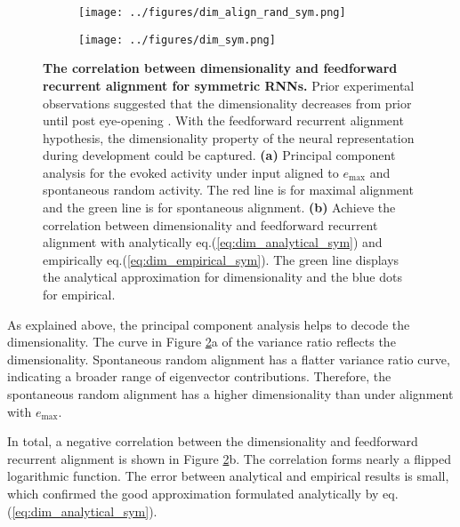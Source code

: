 \documentclass[11pt]{article}
\begin{document}
		\begin{figure}[H] 
			\centering
			\begin{subfigure}[b]{0.45\textwidth} 
				\texttt{[image: ../figures/dim\_align\_rand\_sym.png]}
				\caption{}
			\end{subfigure}
			\begin{subfigure}[b]{0.45\textwidth}
				\texttt{[image: ../figures/dim\_sym.png]}
				\caption{}
				\label{fig:dim_sym}
			\end{subfigure}
			\vspace{-0.2cm}
			\caption[The correlation between dimensionality and feedforward recurrent alignment for symmetric RNNs]{\textbf{The correlation between dimensionality and feedforward recurrent alignment for symmetric RNNs.} Prior experimental observations suggested that the dimensionality decreases from prior until post eye-opening \cite{tragenap2023nature}. With the feedforward recurrent alignment hypothesis, the dimensionality property of the neural representation during development could be captured. \textbf{(a)} Principal component analysis for the evoked activity under input aligned to $e_{\text{max}}$ and spontaneous random activity. The red line is for maximal alignment and the green line is for spontaneous alignment. \textbf{(b)} Achieve the correlation between dimensionality and feedforward recurrent alignment with analytically eq.(\ref{eq:dim_analytical_sym}) and empirically eq.(\ref{eq:dim_empirical_sym}). The green line displays the analytical approximation for dimensionality and the blue dots for empirical.} 
			\label{fig:correlation_dim_ffrec_sym}
		\end{figure}
	\vspace{-0.2cm}
	As explained above, the principal component analysis helps to decode the dimensionality. The curve in Figure \ref{fig:correlation_dim_ffrec_sym}a of the variance ratio reflects the dimensionality. Spontaneous random alignment has a flatter variance ratio curve, indicating a broader range of eigenvector contributions. Therefore, the spontaneous random alignment has a higher dimensionality than under alignment with $e_{\text{max}}$. 
	
	In total, a negative correlation between the dimensionality and feedforward recurrent alignment is shown in Figure \ref{fig:correlation_dim_ffrec_sym}b. The correlation forms nearly a flipped logarithmic function. The error between analytical and empirical results is small, which confirmed the good approximation formulated analytically by eq.(\ref{eq:dim_analytical_sym}). 
	
\end{document}
